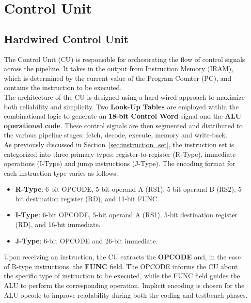 \chapter{Control Unit}
\label{chap:03_control_unit}

\section{Hardwired Control Unit}
The Control Unit (CU) is responsible for orchestrating the flow of control signals across the pipeline. It takes in the output from Instruction Memory (IRAM), which is determined by the current value of the Program Counter (PC), and contains the instruction to be executed. \\

The architecture of the CU is designed using a hard-wired approach to maximize both reliability and simplicity. Two \textbf{Look-Up Tables} are employed within the combinational logic to generate an \textbf{18-bit Control Word} signal and the \textbf{ALU operational code}. These control signals are then segmented and distributed to the various pipeline stages: fetch, decode, execute, memory and write-back. \\

As previously discussed in Section~\ref{sec:instruction_set}, the instruction set is categorized into three primary types: register-to-register (R-Type), immediate operations (I-Type) and jump instructions (J-Type). The encoding format for each instruction type varies as follows:
\begin{itemize}
    \item \textbf{R-Type}: 6-bit OPCODE, 5-bit operand A (RS1), 5-bit operand B (RS2), 5-bit destination register (RD), and 11-bit FUNC.
    \item \textbf{I-Type}: 6-bit OPCODE, 5-bit operand A (RS1), 5-bit destination register (RD), and 16-bit immediate.
    \item \textbf{J-Type}: 6-bit OPCODE and 26-bit immediate.
\end{itemize}

Upon receiving an instruction, the CU extracts the \textbf{OPCODE} and, in the case of R-type instructions, the \textbf{FUNC} field. The OPCODE informs the CU about the specific type of instruction to be executed, while the FUNC field guides the ALU to perform the corresponding operation. Implicit encoding is chosen for the ALU opcode to improve readability during both the coding and testbench phases. \\

